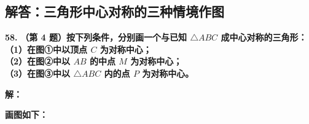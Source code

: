 \newpage

\subsection{解答：三角形中心对称的三种情境作图}

\vspace{0.6cm}

\textbf{\LARGE 58.} \textbf{（第 4 题）按下列条件，分别画一个与已知 $\triangle ABC$ 成中心对称的三角形：\\
（1）在图①中以顶点 $C$ 为对称中心；\\
（2）在图②中以 $AB$ 的中点 $M$ 为对称中心；\\
（3）在图③中以 $\triangle ABC$ 内的点 $P$ 为对称中心。}

\vspace{0.4cm}
\textbf{解：}

\textbf{画图如下：}

